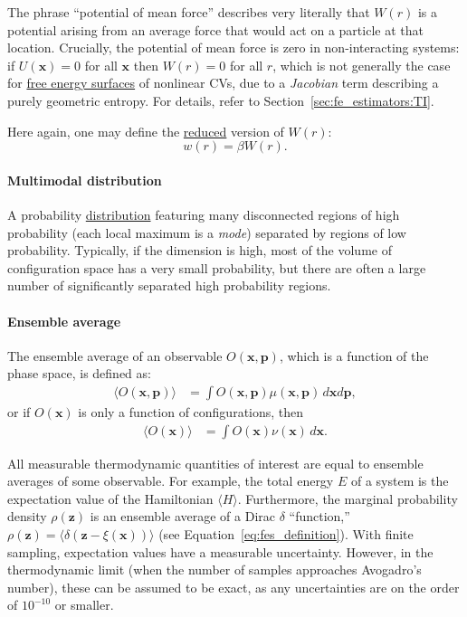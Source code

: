 \documentclass[9pt,review]{livecoms}
\newcommand{\vx}{\mathbf{x}}
\newcommand{\vp}{\mathbf{p}}
\newcommand{\vz}{\mathbf{z}}
\begin{document}
The phrase ``potential of mean force'' describes very literally that $W(r)$ is a potential arising from an average force that would act on a particle at that location. Crucially, the potential of mean force is zero in non-interacting systems: if $U(\vx) = 0$ for all $\vx$ then $W(r) = 0$ for all $r$, which is not generally the case for \hyperlink{ref:FES} {free energy surfaces} of nonlinear CVs, due to a \textit{Jacobian} term describing a purely geometric entropy.
For details, refer to Section~\ref{sec:fe_estimators:TI}.

Here again, one may define the \hyperlink{ref:reduced} {reduced} version of $W(r)$:
\begin{equation}
    w(r) = \beta W(r).
\end{equation}

\hypertarget{ref:multimodal} {\paragraph{Multimodal distribution}}

A probability \hyperlink{ref:Distribution} {distribution} featuring many disconnected regions of high probability (each local maximum is a \textit{mode}) separated by regions of low probability. Typically, if the dimension is high, most of the volume of configuration space has a very small probability, but there are often  a large number of significantly separated high probability regions.


\hypertarget{ref:ensemble_average} {\paragraph{Ensemble average}}

The ensemble average of an observable $O(\vx,\vp)$, which is a function of the phase space, is defined as:
\begin{align}
\langle O(\vx,\vp) \rangle &= \int O(\vx, \vp) \mu(\vx, \vp) \, d\vx d\vp,
\end{align}
or if $O(\vx)$ is only a function of configurations, then
\begin{align}
\langle O(\vx) \rangle &= \int O(\vx) \nu(\vx) \, d\vx.
\end{align}

All measurable thermodynamic quantities of interest are equal to ensemble averages of some observable. For example, the total energy $E$ of a system is the expectation value of the Hamiltonian $\langle H \rangle$. Furthermore, the marginal probability density $\rho(\vz)$ is an ensemble average of a Dirac $\delta$ ``function,'' $\rho(\vz)=\langle \delta\left(\vz-\xi(\vx)\right) \rangle$ (see Equation~\ref{eq:fes_definition}).  With finite sampling, expectation values have a measurable uncertainty. However, in the thermodynamic limit (when the number of samples approaches Avogadro's number), these can be assumed to be exact, as any uncertainties are on the order of $10^{-10}$ or smaller.
\end{document}
